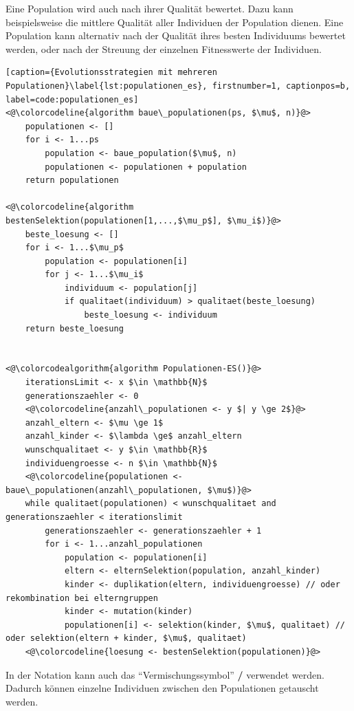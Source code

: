 Eine Population wird auch nach ihrer Qualität bewertet.
Dazu kann beispielsweise die mittlere Qualität aller Individuen der Population dienen.
Eine Population kann alternativ nach der Qualität ihres besten Individuums bewertet werden, oder nach der Streuung der einzelnen Fitnesswerte der Individuen.

\begin{lstlisting}[caption={Evolutionsstrategien mit mehreren Populationen}\label{lst:populationen_es}, firstnumber=1, captionpos=b, label=code:populationen_es]
<@\colorcodeline{algorithm baue\_populationen(ps, $\mu$, n)}@>
	populationen <- []
	for i <- 1...ps
		population <- baue_population($\mu$, n)	
		populationen <- populationen + population
	return populationen
	
<@\colorcodeline{algorithm bestenSelektion(populationen[1,...,$\mu_p$], $\mu_i$)}@>
	beste_loesung <- []
	for i <- 1...$\mu_p$
		population <- populationen[i]
		for j <- 1...$\mu_i$
			individuum <- population[j]
			if qualitaet(individuum) > qualitaet(beste_loesung)
				beste_loesung <- individuum
	return beste_loesung
	

<@\colorcodealgorithm{algorithm Populationen-ES()}@>
	iterationsLimit <- x $\in \mathbb{N}$
	generationszaehler <- 0
	<@\colorcodeline{anzahl\_populationen <- y $| y \ge 2$}@>
	anzahl_eltern <- $\mu \ge 1$
	anzahl_kinder <- $\lambda \ge$ anzahl_eltern
	wunschqualitaet <- y $\in \mathbb{R}$
	individuengroesse <- n $\in \mathbb{N}$
	<@\colorcodeline{populationen <- baue\_populationen(anzahl\_populationen, $\mu$)}@>
	while qualitaet(populationen) < wunschqualitaet and generationszaehler < iterationslimit
		generationszaehler <- generationszaehler + 1
		for i <- 1...anzahl_populationen
			population <- populationen[i]
			eltern <- elternSelektion(population, anzahl_kinder)
			kinder <- duplikation(eltern, individuengroesse) // oder rekombination bei elterngruppen
			kinder <- mutation(kinder)
			populationen[i] <- selektion(kinder, $\mu$, qualitaet) // oder selektion(eltern + kinder, $\mu$, qualitaet)
	<@\colorcodeline{loesung <- bestenSelektion(populationen)}@>
\end{lstlisting}

In der Notation kann auch das \enquote{Vermischungssymbol} \textbf{/} verwendet werden. Dadurch können einzelne Individuen zwischen den Populationen getauscht werden.

